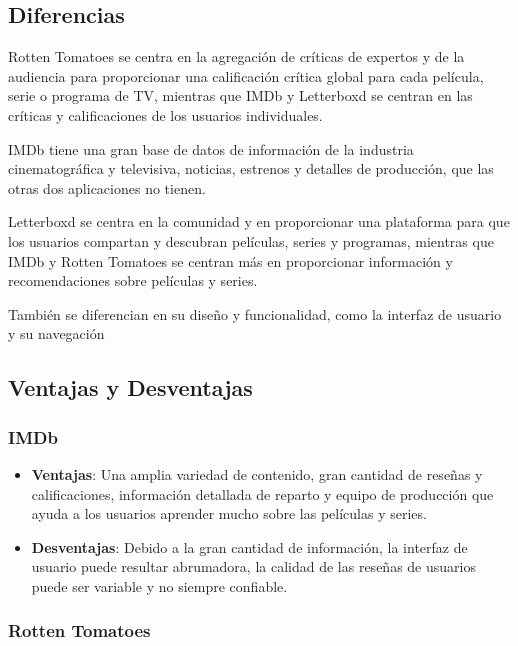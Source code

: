 \subsection{Diferencias}

Rotten Tomatoes se centra en la agregación de críticas de expertos y de la audiencia para proporcionar 
una calificación crítica global para cada película, serie o programa de TV, mientras que IMDb y 
Letterboxd se centran en las críticas y calificaciones de los usuarios individuales.

IMDb tiene una gran base de datos de información de la industria cinematográfica y televisiva, 
noticias, estrenos y detalles de producción, que las otras dos aplicaciones no tienen.

Letterboxd se centra en la comunidad y en proporcionar una plataforma para que los usuarios compartan y 
descubran películas, series y programas, mientras que IMDb y Rotten Tomatoes se centran más en 
proporcionar información y recomendaciones sobre películas y series.

También se diferencian en su diseño y funcionalidad, como la interfaz de usuario y su navegación

\subsection{Ventajas y Desventajas}

\subsubsection{IMDb}

\begin{itemize}
    \item \textbf{Ventajas}: Una amplia variedad de contenido, gran cantidad de reseñas y 
    calificaciones, información detallada de reparto y equipo de producción que ayuda a los usuarios 
    aprender mucho sobre las películas y series.
    \item \textbf{Desventajas}: Debido a la gran cantidad de información, la interfaz de usuario puede 
    resultar abrumadora, la calidad de las reseñas de usuarios puede ser variable y no siempre 
    confiable.
\end{itemize}

\subsubsection{Rotten Tomatoes}

